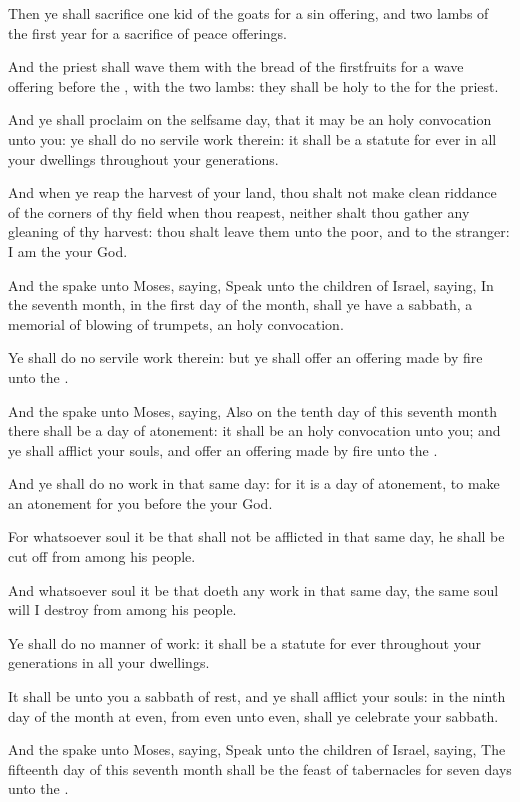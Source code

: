 \Verse Then ye shall sacrifice one kid of the goats for a sin offering, and two lambs of the first year for a sacrifice of peace offerings.

\Verse And the priest shall wave them with the bread of the firstfruits for a wave offering before the \LORD, with the two lambs: they shall be holy to the \LORD for the priest.

\Verse And ye shall proclaim on the selfsame day, that it may be an holy convocation unto you: ye shall do no servile work therein: it shall be a statute for ever in all your dwellings throughout your generations.

\Verse And when ye reap the harvest of your land, thou shalt not make clean riddance of the corners of thy field when thou reapest, neither shalt thou gather any gleaning of thy harvest: thou shalt leave them unto the poor, and to the stranger: I am the \LORD your God.

\Verse And the \LORD spake unto Moses, saying, \Verse Speak unto the children of Israel, saying, In the seventh month, in the first day of the month, shall ye have a sabbath, a memorial of blowing of trumpets, an holy convocation.

\Verse Ye shall do no servile work therein: but ye shall offer an offering made by fire unto the \LORD.

\Verse And the \LORD spake unto Moses, saying, \Verse Also on the tenth day of this seventh month there shall be a day of atonement: it shall be an holy convocation unto you; and ye shall afflict your souls, and offer an offering made by fire unto the \LORD.

\Verse And ye shall do no work in that same day: for it is a day of atonement, to make an atonement for you before the \LORD your God.

\Verse For whatsoever soul it be that shall not be afflicted in that same day, he shall be cut off from among his people.

\Verse And whatsoever soul it be that doeth any work in that same day, the same soul will I destroy from among his people.

\Verse Ye shall do no manner of work: it shall be a statute for ever throughout your generations in all your dwellings.

\Verse It shall be unto you a sabbath of rest, and ye shall afflict your souls: in the ninth day of the month at even, from even unto even, shall ye celebrate your sabbath.

\Verse And the \LORD spake unto Moses, saying, \Verse Speak unto the children of Israel, saying, The fifteenth day of this seventh month shall be the feast of tabernacles for seven days unto the \LORD.

